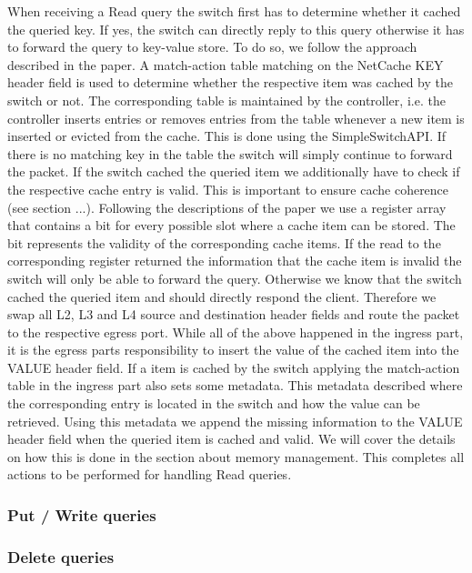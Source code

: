 \documentclass[11pt,oneside,a4paper]{article}
\begin{document}
When receiving a Read query the switch first has to determine whether it cached the queried key.
If yes, the switch can directly reply to this query otherwise it has to forward the query to key-value store.
To do so, we follow the approach described in the paper.
A match-action table matching on the NetCache KEY header field is used to determine whether the respective item was cached by the switch or not.
The corresponding table is maintained by the controller, i.e. the controller inserts entries or removes entries from the table whenever a new item is inserted or evicted from the cache.
This is done using the SimpleSwitchAPI.
If there is no matching key in the table the switch will simply continue to forward the packet.
If the switch cached the queried item we additionally have to check if the respective cache entry is valid.
This is important to ensure cache coherence (see section ...).
Following the descriptions of the paper we use a register array that contains a bit for every possible slot where a cache item can be stored. 
The bit represents the validity of the corresponding cache items.
If the read to the corresponding register returned the information that the cache item is invalid the switch will only be able to forward the query.
Otherwise we know that the switch cached the queried item and should directly respond the client.
Therefore we swap all L2, L3 and L4 source and destination header fields and route the packet to the respective egress port. 
While all of the above happened in the ingress part, it is the egress parts responsibility to insert the value of the cached item into the VALUE header field.
If a item is cached by the switch applying the match-action table in the ingress part also sets some metadata. This metadata described where the corresponding entry is located in the switch and how the value can be retrieved.
Using this metadata we append the missing information to the VALUE header field when the queried item is cached and valid.
We will cover the details on how this is done in the section about memory management.
This completes all actions to be performed for handling Read queries.



\subsubsection{Put / Write queries}

\subsubsection{Delete queries}
\end{document}
